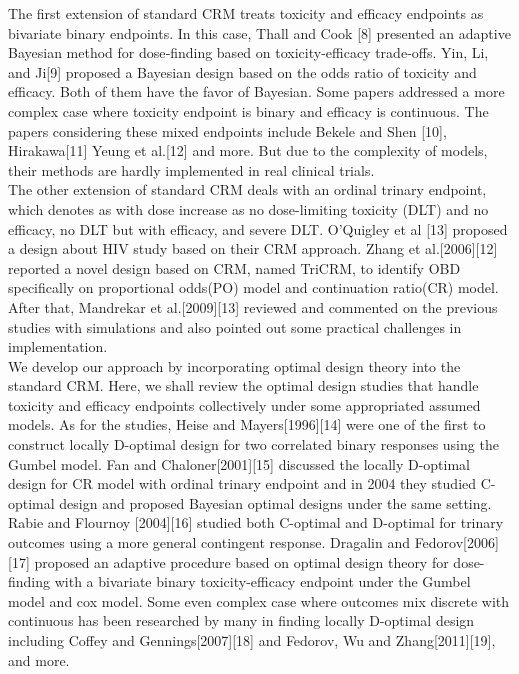 \documentclass[12pt]{article}
\begin{document}
The first extension of standard CRM treats toxicity and efficacy endpoints as bivariate binary endpoints. In this case, Thall and Cook [8] presented an adaptive Bayesian method for dose‐finding based on toxicity-efficacy trade‐offs. Yin, Li, and Ji[9] proposed a Bayesian design based on the odds ratio of toxicity and efficacy. Both of them have the favor of Bayesian. Some papers addressed a more complex case where toxicity endpoint is binary and efficacy is continuous. The papers considering these mixed endpoints include Bekele and Shen [10], Hirakawa[11] Yeung et al.[12] and more. But due to the complexity of models, their methods are hardly implemented in real clinical trials.\\
The other extension of standard CRM deals with an ordinal trinary endpoint, which denotes as with dose increase as no dose-limiting toxicity (DLT) and no efficacy, no DLT but with efficacy, and severe DLT. O’Quigley et al [13] proposed a design about HIV study based on their CRM approach. Zhang et al.[2006][12] reported a novel design based on CRM, named TriCRM, to identify OBD specifically on proportional odds(PO) model and continuation ratio(CR) model. After that, Mandrekar et al.[2009][13] reviewed and commented on the previous studies with simulations and also pointed out some practical challenges in implementation.\\
We develop our approach by incorporating optimal design theory into the standard CRM. Here, we shall review the optimal design studies that handle toxicity and efficacy endpoints collectively under some appropriated assumed models. As for the studies, Heise and Mayers[1996][14] were one of the first to construct locally D-optimal design for two correlated binary responses using the Gumbel model. Fan and Chaloner[2001][15] discussed the locally D-optimal design for CR model with ordinal trinary endpoint and in 2004 they studied C-optimal design and proposed Bayesian optimal designs under the same setting. Rabie and Flournoy [2004][16] studied both C-optimal and D-optimal for trinary outcomes using a more general contingent response. Dragalin and Fedorov[2006][17] proposed an adaptive procedure based on optimal design theory for dose-finding with a bivariate binary toxicity-efficacy endpoint under the Gumbel model and cox model. Some even complex case where outcomes mix discrete with continuous has been researched by many in finding locally D-optimal design including Coffey and Gennings[2007][18] and Fedorov, Wu and Zhang[2011][19], and more.\\
\end{document}
